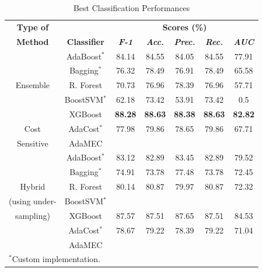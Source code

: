 \documentclass[conference]{IEEEtran}
\begin{document}
\begin{table}[htbp]
\caption{Best Classification Performances}

\begin{center}

\begin{tabular}{|c|c|c|c|c|c|c|}

\hline
\textbf{Type of} & & \multicolumn{5}{|c|}{\textbf{Scores (\%)}} \\
\cline{3-7} 

\textbf{Method} & \textbf{Classifier} &\textbf{\textit{F-1}}& \textbf{\textit{Acc.}}&\textbf{\textit{Prec.}}&\textbf{\textit{Rec.}}&\textbf{\textit{AUC}}\\
\hline

& AdaBoost$^*$ &84.14&84.55&84.05&84.55&77.91  \\
\cline{2-7} 

& Bagging$^*$ &76.32&78.49&76.91&78.49&65.58  \\
\cline{2-7} 

Ensemble & R. Forest &70.73&76.96&78.39&76.96&57.71  \\
\cline{2-7} 

& BoostSVM$^*$ &62.18&73.42&53.91&73.42&0.5  \\
\cline{2-7} 

& XGBoost  &\textbf{88.28}&\textbf{88.63}&\textbf{88.38}&\textbf{88.63}&\textbf{82.82} \\
\hline

Cost & AdaCost$^*$ &77.98&79.86&78.65&79.86&67.71  \\
\cline{2-7} 

Sensitive& AdaMEC & & & & &  \\
\hline

& AdaBoost$^*$ &83.12&82.89&83.45&82.89&79.52  \\
\cline{2-7} 

& Bagging$^*$ &74.91&73.78&77.48&73.78&72.45  \\
\cline{2-7} 

Hybrid & R. Forest &80.14&80.87&79.97&80.87&72.32  \\
\cline{2-7} 

(using under-& BoostSVM$^*$   & & & & &\\
\cline{2-7} 

sampling)& XGBoost  &87.57&87.51&87.65&87.51&84.53 \\
\cline{2-7} 

 & AdaCost$^*$ &78.67&79.22&78.39&79.22&71.04  \\
\cline{2-7} 

& AdaMEC & & & & &  \\
\hline

\multicolumn{4}{l}{$^{\mathrm{*}}$Custom implementation.}

\end{tabular}

\label{tab1}
\end{center}
\end{table}
\end{document}

